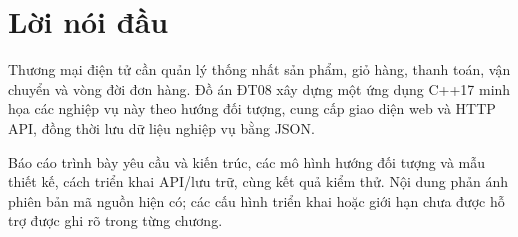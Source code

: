 \chapter*{Lời nói đầu}

Thương mại điện tử cần quản lý thống nhất sản phẩm, giỏ hàng, thanh toán, vận chuyển và vòng đời đơn hàng. Đồ án ĐT08 xây dựng một ứng dụng C++17 minh họa các nghiệp vụ này theo hướng đối tượng, cung cấp giao diện web và HTTP API, đồng thời lưu dữ liệu nghiệp vụ bằng JSON.

Báo cáo trình bày yêu cầu và kiến trúc, các mô hình hướng đối tượng và mẫu thiết kế, cách triển khai API/lưu trữ, cùng kết quả kiểm thử. Nội dung phản ánh phiên bản mã nguồn hiện có; các cấu hình triển khai hoặc giới hạn chưa được hỗ trợ được ghi rõ trong từng chương.
